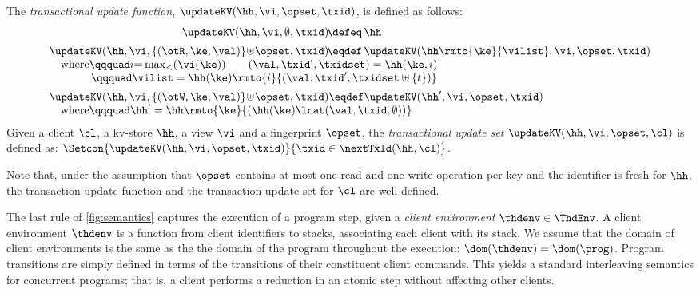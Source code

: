 \begin{definition}
\label{eq:updatekv}
\label{def:updatekv}
The \emph{transactional update function},  $\updateKV(\hh, \vi, \opset, \txid)$,  is
defined as follows:
\[
\begin{array}{@{} l @{}}
	\begin{array}{@{} r @{} l @{}}
		\updateKV(\hh, \vi, \emptyset, \txid) \!\defeq\,  & \hh \vspace{5pt}\\
	    \updateKV(\hh, \vi, \{(\otR, \ke, \val)\} \!\uplus\! \opset, \txid) 
	    \!\eqdef\, & 
	    \updateKV(\hh\rmto{\ke}{\vilist},\vi, \opset, \txid)
	\end{array}\\
%	
	\quad\text{where} 
	\qqquad 
	i {=} \max_{<}(\vi(\ke)) \qquad (\val, \txid', \txidset) = \hh(\ke, i) \\
	\quad\phantom{where} 
	\qqquad 
	\vilist = \hh(\ke)\rmto{i}{(\val, \txid', \txidset \uplus \{ t \})} \vspace{5pt}\\
%	
	\updateKV(\hh, \vi, \{(\otW, \ke, \val)\} \!\uplus\! \opset, \txid) 
    	\eqdef
    \updateKV(\hh', \vi, \opset, \txid) \\
%
 	\quad\text{where} 
	\qqquad 
	\hh' = \hh\rmto{\ke}{ ( \hh(\ke) \lcat (\val, \txid, \emptyset) ) }   
\end{array}
\]
%
Given a client $\cl$, a kv-store $\hh$, a view $\vi$ and a fingerprint $\opset$, 
the \emph{transactional update set} $\updateKV(\hh, \vi, \opset, \cl)$ is defined as:  
$\Setcon{\updateKV(\hh, \vi, \opset, \txid)}{\txid \in \nextTxId(\hh, \cl)}$.
\end{definition}

Note that,  under the assumption that $\opset$ contains at most one read and one write 
operation per key and the identifier is fresh for $\hh$, 
the transaction update function and the transaction update set for
$\cl$ are well-defined. 

The last rule of \cref{fig:semantics} captures the execution of a program step, 
given a \emph{client environment} $\thdenv \in \ThdEnv$. 
A client environment $\thdenv$ is a function from client identifiers to stacks, associating each client with its stack. 
We assume that the domain of client environments is the same as the
the domain of the program throughout the execution: 
$\dom(\thdenv) = \dom(\prog)$.
Program transitions are simply defined in terms of the transitions of
their constituent client commands. 
This  yields a  standard interleaving semantics for concurrent
programs; 
that is, 
a client performs a reduction in an atomic step without
affecting other clients. 
